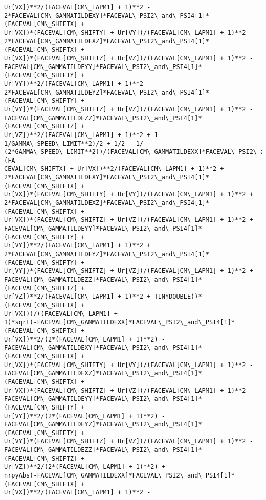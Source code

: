 \documentclass[landscape,letterpaper,10pt,english]{article}
\begin{document}
\begin{Verbatim}[commandchars=\\\{\}]
Ur[VX])**2/(FACEVAL[CM\_LAPM1] + 1)**2 -
2*FACEVAL[CM\_GAMMATILDEXY]*FACEVAL\_PSI2\_and\_PSI4[1]*(FACEVAL[CM\_SHIFTX] +
Ur[VX])*(FACEVAL[CM\_SHIFTY] + Ur[VY])/(FACEVAL[CM\_LAPM1] + 1)**2 -
2*FACEVAL[CM\_GAMMATILDEXZ]*FACEVAL\_PSI2\_and\_PSI4[1]*(FACEVAL[CM\_SHIFTX] +
Ur[VX])*(FACEVAL[CM\_SHIFTZ] + Ur[VZ])/(FACEVAL[CM\_LAPM1] + 1)**2 -
FACEVAL[CM\_GAMMATILDEYY]*FACEVAL\_PSI2\_and\_PSI4[1]*(FACEVAL[CM\_SHIFTY] +
Ur[VY])**2/(FACEVAL[CM\_LAPM1] + 1)**2 -
2*FACEVAL[CM\_GAMMATILDEYZ]*FACEVAL\_PSI2\_and\_PSI4[1]*(FACEVAL[CM\_SHIFTY] +
Ur[VY])*(FACEVAL[CM\_SHIFTZ] + Ur[VZ])/(FACEVAL[CM\_LAPM1] + 1)**2 -
FACEVAL[CM\_GAMMATILDEZZ]*FACEVAL\_PSI2\_and\_PSI4[1]*(FACEVAL[CM\_SHIFTZ] +
Ur[VZ])**2/(FACEVAL[CM\_LAPM1] + 1)**2 + 1 - 1/GAMMA\_SPEED\_LIMIT**2)/2 + 1/2 - 1/
(2*GAMMA\_SPEED\_LIMIT**2))/(FACEVAL[CM\_GAMMATILDEXX]*FACEVAL\_PSI2\_and\_PSI4[1]*(FA
CEVAL[CM\_SHIFTX] + Ur[VX])**2/(FACEVAL[CM\_LAPM1] + 1)**2 +
2*FACEVAL[CM\_GAMMATILDEXY]*FACEVAL\_PSI2\_and\_PSI4[1]*(FACEVAL[CM\_SHIFTX] +
Ur[VX])*(FACEVAL[CM\_SHIFTY] + Ur[VY])/(FACEVAL[CM\_LAPM1] + 1)**2 +
2*FACEVAL[CM\_GAMMATILDEXZ]*FACEVAL\_PSI2\_and\_PSI4[1]*(FACEVAL[CM\_SHIFTX] +
Ur[VX])*(FACEVAL[CM\_SHIFTZ] + Ur[VZ])/(FACEVAL[CM\_LAPM1] + 1)**2 +
FACEVAL[CM\_GAMMATILDEYY]*FACEVAL\_PSI2\_and\_PSI4[1]*(FACEVAL[CM\_SHIFTY] +
Ur[VY])**2/(FACEVAL[CM\_LAPM1] + 1)**2 +
2*FACEVAL[CM\_GAMMATILDEYZ]*FACEVAL\_PSI2\_and\_PSI4[1]*(FACEVAL[CM\_SHIFTY] +
Ur[VY])*(FACEVAL[CM\_SHIFTZ] + Ur[VZ])/(FACEVAL[CM\_LAPM1] + 1)**2 +
FACEVAL[CM\_GAMMATILDEZZ]*FACEVAL\_PSI2\_and\_PSI4[1]*(FACEVAL[CM\_SHIFTZ] +
Ur[VZ])**2/(FACEVAL[CM\_LAPM1] + 1)**2 + TINYDOUBLE))*(FACEVAL[CM\_SHIFTX] +
Ur[VX]))/((FACEVAL[CM\_LAPM1] +
1)*sqrt(-FACEVAL[CM\_GAMMATILDEXX]*FACEVAL\_PSI2\_and\_PSI4[1]*(FACEVAL[CM\_SHIFTX] +
Ur[VX])**2/(2*(FACEVAL[CM\_LAPM1] + 1)**2) -
FACEVAL[CM\_GAMMATILDEXY]*FACEVAL\_PSI2\_and\_PSI4[1]*(FACEVAL[CM\_SHIFTX] +
Ur[VX])*(FACEVAL[CM\_SHIFTY] + Ur[VY])/(FACEVAL[CM\_LAPM1] + 1)**2 -
FACEVAL[CM\_GAMMATILDEXZ]*FACEVAL\_PSI2\_and\_PSI4[1]*(FACEVAL[CM\_SHIFTX] +
Ur[VX])*(FACEVAL[CM\_SHIFTZ] + Ur[VZ])/(FACEVAL[CM\_LAPM1] + 1)**2 -
FACEVAL[CM\_GAMMATILDEYY]*FACEVAL\_PSI2\_and\_PSI4[1]*(FACEVAL[CM\_SHIFTY] +
Ur[VY])**2/(2*(FACEVAL[CM\_LAPM1] + 1)**2) -
FACEVAL[CM\_GAMMATILDEYZ]*FACEVAL\_PSI2\_and\_PSI4[1]*(FACEVAL[CM\_SHIFTY] +
Ur[VY])*(FACEVAL[CM\_SHIFTZ] + Ur[VZ])/(FACEVAL[CM\_LAPM1] + 1)**2 -
FACEVAL[CM\_GAMMATILDEZZ]*FACEVAL\_PSI2\_and\_PSI4[1]*(FACEVAL[CM\_SHIFTZ] +
Ur[VZ])**2/(2*(FACEVAL[CM\_LAPM1] + 1)**2) +
nrpyAbs(-FACEVAL[CM\_GAMMATILDEXX]*FACEVAL\_PSI2\_and\_PSI4[1]*(FACEVAL[CM\_SHIFTX] +
Ur[VX])**2/(FACEVAL[CM\_LAPM1] + 1)**2 -

\end{Verbatim}
\end{document}
